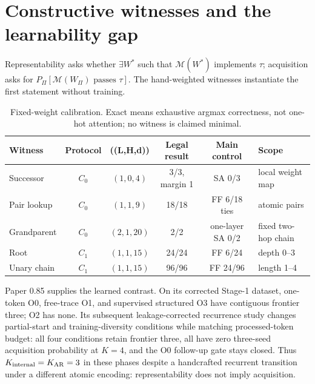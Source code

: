 \documentclass[10pt]{article}
\begin{document}
\section{Constructive witnesses and the learnability gap}
Representability asks whether $\exists W^*$ such that $\mathcal M(W^*)$ implements $\tau$; acquisition asks for $P_\Pi[\mathcal M(W_\Pi)\text{ passes }\tau]$. The hand-weighted witnesses instantiate the first statement without training.
\begin{table}[H]\centering\small
\begin{tabularx}{\linewidth}{lccccY}\toprule Witness&Protocol&((L,H,d))&Legal result&Main control&Scope\\\midrule
Successor&$C_0$&$(1,0,4)$&3/3, margin 1&SA 0/3&local weight map\\ Pair lookup&$C_0$&$(1,1,9)$&18/18&FF 6/18 ties&atomic pairs\\ Grandparent&$C_0$&$(2,1,20)$&2/2&one-layer SA 0/2&fixed two-hop chain\\ Root&$C_1$&$(1,1,15)$&24/24&FF 6/24&depth 0--3\\ Unary chain&$C_1$&$(1,1,15)$&96/96&FF 24/96&length 1--4\\\bottomrule\end{tabularx}
\caption{Fixed-weight calibration. Exact means exhaustive argmax correctness, not one-hot attention; no witness is claimed minimal.}\end{table}
Paper 0.85 supplies the learned contrast. On its corrected Stage-1 dataset, one-token O0, free-trace O1, and supervised structured O3 have contiguous frontier three; O2 has none. Its subsequent leakage-corrected recurrence study changes partial-start and training-diversity conditions while matching processed-token budget: all four conditions retain frontier three, all have zero three-seed acquisition probability at $K=4$, and the O0 follow-up gate stays closed. Thus $K_{\rm internal}=K_{\rm AR}=3$ in these phases despite a handcrafted recurrent transition under a different atomic encoding: representability does not imply acquisition.
\end{document}
